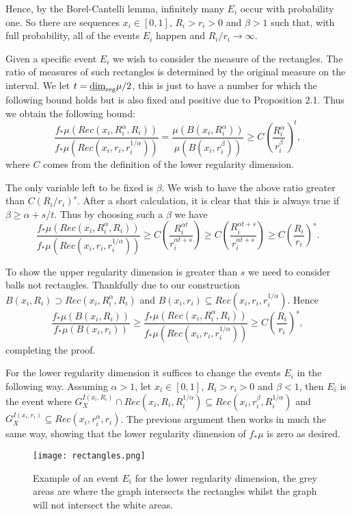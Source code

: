 Hence, by the Borel-Cantelli lemma, infinitely many $E_i$ occur with probability one. So there are sequences $x_i \in [0,1]$, $R_i > r_i > 0$ and $\beta > 1$ such that, with full probability, all of the events $E_i$ happen and $R_i/r_i \rightarrow \infty$. 

Given a specific event $E_i$ we wish to consider the measure of the rectangles. The ratio of measures of such rectangles is determined by the original measure on the interval. We let $t = \underline{\dim}_{\textup{reg}} \mu / 2$, this is just to have a number for which the following bound holds but is also fixed and positive due to Proposition 2.1. Thus we obtain the following bound:
\[
\frac{f_*\mu(Rec(x_i,R_i^{\alpha},R_i))}{f_*\mu(Rec(x_i,r_i,r_i^{1/\alpha}))} = \frac{\mu(B(x_i, R_i^{\alpha}))}{\mu(B(x_i, r_i^{\beta}))} \ge C\left(\frac{R_i^{\alpha}}{r_i^{\beta}}\right)^t, 
\]
where $C$ comes from the definition of the lower regularity dimension.

The only variable left to be fixed is $\beta$. We wish to have the above ratio greater than $C(R_i/r_i)^s$. After a short calculation, it is clear that this is always true if $\beta \ge \alpha + s/t$. Thus by choosing such a $\beta$ we have
\[
\frac{f_*\mu(Rec(x_i,R_i^{\alpha},R_i))}{f_*\mu(Rec(x_i,r_i,r_i^{1/\alpha}))} \ge C\left(\frac{R_i^{\alpha t}}{r_i^{\alpha t + s} }\right) \ge C\left(\frac{R_i^{\alpha t + s}}{r_i^{\alpha t + s} }\right)  \ge
C\left(\frac{R_i}{r_i}\right)^s. 
\]

To show the upper regularity dimension is greater than $s$ we need to consider balls not rectangles. Thankfully due to our construction $B(x_i,R_i) \supset Rec(x_i, R_i^\alpha, R_i)$ and $B(x_i,r_i) \subseteq Rec(x_i, r_i, r_i^{1/\alpha})$. Hence
\[
\frac{f_*\mu(B(x_i,R_i))}{f_*\mu(B(x_i,r_i))} \ge \frac{f_*\mu(Rec(x_i,R_i^{\alpha},R_i))}{f_*\mu(Rec(x_i,r_i,r_i^{1/\alpha}))} \ge C\left(\frac{R_i}{r_i}\right)^s ,
\]
completing the proof.


For the lower regularity dimension it suffices to change the events $E_i$ in the following way. Assuming $\alpha>1$, let $x_i \in [0,1]$, $R_i > r_i > 0$ and $\beta < 1$, then $E_i$ is the event where $G_X^{I(x_i, R_i)} \cap Rec(x_i,R_i,R_i^{1/\alpha}) \subseteq Rec(x_i, r_i^{\beta}, R_i^{1/\alpha})$ and $G_X^{I(x_i, r_i)} \subseteq Rec(x_i, r_i^{\alpha}, r_i)$. The previous argument then works in much the same way, showing that the lower regularity dimension of $f_*\mu$ is zero as desired.

\begin{figure}[htbp]
	\centering
	\texttt{[image: rectangles.png]}
	\caption{Example of an event $E_i$ for the lower regularity dimension, the grey areas are where the graph intersects the rectangles whilst the graph will not intersect the white areas.}
	\label{brownian_event}
\end{figure}






